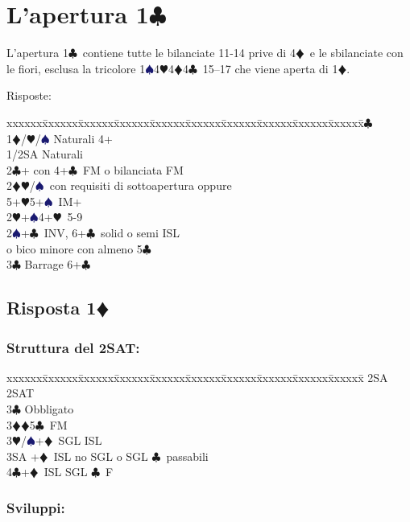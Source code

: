 \documentclass[a4paper,italian]{article}
\newcommand{\BC}{\textcolor{OliveGreen}{$\clubsuit$}}
\newcommand{\BD}{\textcolor{RedOrange}{$\vardiamondsuit$}}
\newcommand{\BH}{\textcolor{Red2}{$\varheartsuit${}}}
\newcommand{\BS}{\textcolor{MidnightBlue}{$\spadesuit${}}}
\newcommand{\pdfc}{\texorpdfstring{\BC{}}{C}}
\newcommand{\pdfd}{\texorpdfstring{\BD{}}{D}}
\newenvironment{bidtable}
{\begin{tabbing}

    xxxxxx\=xxxxxx\=xxxxxx\=xxxxxx\=xxxxxx\=xxxxxx\=xxxxxx\=xxxxxx\=xxxxxx\=xxxxxx\=\kill}
{\end{tabbing} }%
\begin{document}
\section{L'apertura 1\pdfc}

\begin{multicols}{2}
    L'apertura 1\BC\ contiene tutte le bilanciate 11-14 prive di 4\BD\ e le sbilanciate con le fiori, esclusa la tricolore 1\BS 4\BH 4\BD 4\BC\ 15--17
    che viene aperta di 1\BD .

    Risposte:
    \begin{bidtable}
        1\BC\+\\
        1\BD/\BH/\BS \> Naturali 4+\\
        1/2SA \> Naturali\\
        2\BC {}+ con 4+\BC\ FM o bilanciata FM\\
        2\BD {}\BH /\BS\ con requisiti di sottoapertura oppure\+\\ 5+\BH 5+\BS\ IM+\-\\
        2\BH {}+\BS 4+\BH\ 5-9\\
        2\BS {}+\BC\ INV, 6+\BC\ solid o semi ISL \+\\ o bico minore con almeno 5\BC\-\\
        3\BC \> Barrage 6+\BC \-
    \end{bidtable}

    \subsection{Risposta 1\pdfd}

    \subsubsection{Struttura del 2SAT:}

    \begin{bidtable}
        2SA \> 2SAT\+\\
        3\BC \> Obbligato\+\\
        3\BD {}\BD 5\BC\ FM\\
        3\BH/\BS {}+\BD\ SGL ISL\\
        3SA +\BD\ ISL no SGL o SGL \BC\ passabili\\
        4\BC {}+\BD\ ISL SGL \BC\ F\-\-
    \end{bidtable}

    \subsubsection{Sviluppi:}


\end{multicols}
\end{document}
